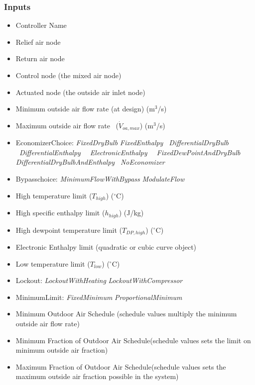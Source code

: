 \subsubsection{Inputs}\label{inputs}

\begin{itemize}
\item
  Controller Name
\item
  Relief air node
\item
  Return air node
\item
  Control node (the mixed air node)
\item
  Actuated node (the outside air inlet node)
\item
  Minimum outside air flow rate (at design) (m\(^{3}\)/s)
\item
  Maximum outside air flow rate~ (\({\dot V_{oa,max }}\)) (m\(^{3}\)/s)
\item
  EconomizerChoice: \emph{FixedDryBulb} \textbar{} \emph{FixedEnthalpy} \textbar{} \emph{~DifferentialDryBulb~} \textbar{} \emph{~DifferentialEnthalpy} \textbar{} \emph{~~ElectronicEnthalpy} \textbar{} \emph{~~FixedDewPointAndDryBulb~~~} \textbar{} \emph{DifferentialDryBulbAndEnthalpy~} \textbar{} \emph{NoEconomizer}
\item
  Bypasschoice: \emph{MinimumFlowWithBypass} \textbar{} \emph{ModulateFlow}
\item
  High temperature limit (\({T_{high}}\)) (\(^{\circ}\)C)
\item
  High specific enthalpy limit (\({h_{high}}\)) (J/kg)
\item
  High dewpoint temperature limit (\({T_{DP,high}}\)) (\(^{\circ}\)C)
\item
  Electronic Enthalpy limit (quadratic or cubic curve object)
\item
  Low temperature limit (\({T_{low}}\)) (\(^{\circ}\)C)
\item
  Lockout: \emph{LockoutWithHeating} \textbar{} \emph{LockoutWithCompressor}
\item
  MinimumLimit: \emph{FixedMinimum} \textbar{} \emph{ProportionalMinimum}
\item
  Minimum Outdoor Air Schedule (schedule values multiply the minimum outside air flow rate)
\item
  Minimum Fraction of Outdoor Air Schedule(schedule values sets the limit on minimum outside air fraction)
\item
  Maximum Fraction of Outdoor Air Schedule(schedule values sets the maximum outside air fraction possible in the system)

\end{itemize}
